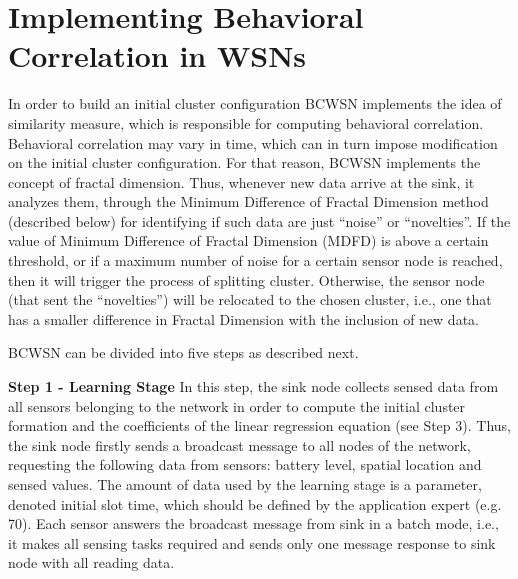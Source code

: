 \documentclass{acm_proc_article-sp}
\begin{document}
\section{Implementing Behavioral Correlation in WSNs}
\label{implementing-bcwsn}

In order to build an initial cluster configuration BCWSN
implements the idea of similarity measure, which is responsible for computing behavioral correlation. Behavioral correlation may vary in time, which can in turn impose modification on the initial cluster configuration. For that reason, BCWSN implements the concept of fractal dimension. Thus, whenever new data arrive at the sink, it analyzes them, through the Minimum Difference of Fractal Dimension method (described below) for identifying if such data are just ``noise'' or ``novelties''. If the
value of Minimum Difference of Fractal Dimension (MDFD) is above a certain threshold, or
if a maximum number of noise for a certain sensor node is reached, then it
will trigger the process of splitting cluster. Otherwise, the sensor node
(that sent the ``novelties'') will be relocated to the chosen cluster, i.e., one that
has a smaller difference in Fractal Dimension with the inclusion of new data.
\vspace*{-.3cm}



BCWSN can be divided into five steps as described next.
\vspace*{-.3cm}

{\bf Step 1 - Learning Stage}
In this step, the sink node collects sensed data from all sensors belonging to
the network in order to compute the initial cluster formation and the
coefficients of the linear regression equation (see Step 3). Thus, the sink 
node firstly sends a broadcast message to all
nodes of the network, requesting the following data from sensors:
battery level, spatial location and sensed values. The amount of data used by the
learning stage is a parameter, denoted initial slot time, which should be
defined by the application expert (e.g. 70). Each sensor answers the broadcast
message from sink in a batch mode, i.e., it makes all sensing tasks required and
sends only one message response to sink node with all reading data.
\vspace*{-.3cm}
\end{document}
